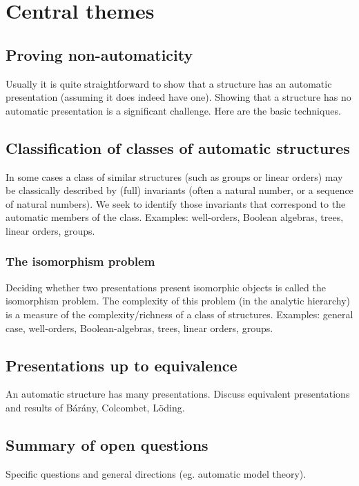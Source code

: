 \documentclass{book}
\begin{document}
\section{Central themes}
\subsection{Proving non-automaticity}
Usually it is quite straightforward to show that a structure has an automatic
presentation (assuming it does indeed have one). Showing that a structure has
no automatic presentation is a significant challenge. Here are the basic techniques.

\subsection{Classification of classes of automatic structures}
In some cases a class of similar structures (such as groups or linear orders)
may be classically described by (full) invariants (often a natural number, or a
sequence of natural numbers).  We seek to identify those invariants that
correspond to the automatic members of the class. Examples: well-orders, Boolean algebras, trees, linear orders, groups.

\subsubsection{The isomorphism problem}
Deciding whether two presentations present isomorphic objects is called the
isomorphism problem. The complexity of this problem (in the analytic hierarchy)
is a measure of the complexity/richness of a class of structures. Examples:
general case, well-orders, Boolean-algebras, trees, linear orders, groups.

\subsection{Presentations up to equivalence}
An automatic structure has many presentations. Discuss equivalent presentations and results of B\'ar\'any, Colcombet, L\"oding.

\subsection{Summary of open questions}
Specific questions and general directions (eg. automatic model theory).
\end{document}
